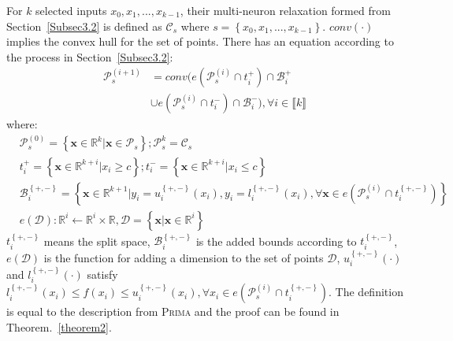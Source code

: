 \documentclass[runningheads]{llncs}
\newcommand{\prima}{\textsc{Prima}\xspace}
\newcommand{\myvec}[1]{\boldsymbol{#1}}
\begin{document}
\begin{definition}\label{Def3}
For $k$ selected inputs $x_{0},x_{1},...,x_{k-1}$, their multi-neuron relaxation formed from Section~\ref{Subsec3.2} is defined as
$\mathcal{C}_{s}$ where $s = \left \{x_{0},x_{1},...,x_{k-1}\right \}$. 
$conv(\cdot)$ implies the convex hull for the set of points. 
There has an equation according to the process in Section~\ref{Subsec3.2}:
\begin{equation}\label{C}
\begin{aligned}
\mathcal{P}_{s}^{(i+1)} &= conv( e(\mathcal{P}^{(i)}_{s} \cap t_{i}^{+} ) \cap \mathcal{B}_{i}^{+}\\ 
&\cup e(\mathcal{P}^{(i)}_{s} \cap t_{i}^{-} ) \cap \mathcal{B}_{i}^{-}), \forall i \in \llbracket  k \rrbracket
\end{aligned}
\end{equation}
where:
\begin{equation*}
\begin{aligned}
&\mathcal{P}_{s}^{(0)} = \left\{ \myvec{x} \in \mathbb{R}^{k}|\myvec{x} \in \mathcal{P}_{s} \right\};\mathcal{P}_{s}^{k}=\mathcal{C}_{s}\\
&t_{i}^{+} = \left\{ \myvec{x} \in \mathbb{R}^{k+i}|x_{i} \geq c \right\};t_{i}^{-} = \left\{ \myvec{x} \in \mathbb{R}^{k+i}|x_{i} \leq c \right\}\\
&\mathcal{B}_{i}^{\left\{+,-\right\}} = \left\{ \myvec{x} \in \mathbb{R}^{k+1} | y_{i}=u^{\left\{+,-\right\}}_{i}(x_{i}),y_{i}=l^{\left\{+,-\right\}}_{i}(x_{i}),\forall \myvec{x} \in e(\mathcal{P}^{(i)}_{s} \cap t_{i}^{\left\{+,-\right\}}) \right\} \\
&e(\mathcal{D}):\mathbb{R}^{i} \leftarrow \mathbb{R}^{i}\times \mathbb{R}, \mathcal{D} = \left\{ \myvec{x}|\myvec{x}\in \mathbb{R}^{i} \right\}
\end{aligned}
\end{equation*}
$t_{i}^{\left\{+,- \right\}}$ means the split space, $\mathcal{B}_{i}^{\left\{+,- \right\}}$ is the added bounds according to $t_{i}^{\left\{+,- \right\}}$, $e(\mathcal{D})$ is the function for adding a dimension to the  set of points $\mathcal{D}$, $u^{\left\{+,-\right\}}_{i}(\cdot)$ and $l^{\left\{+,-\right\}}_{i}(\cdot)$ satisfy $l^{\left\{+,- \right\}}_{i}(x_{i}) \leq f(x_{i}) \leq u^{\left\{+,- \right\}}_{i}(x_{i}), \forall x_{i} \in e(\mathcal{P}^{(i)}_{s} \cap t_{i}^{\left\{+,-\right\}})$. The definition is equal to the description from \prima and the proof can be found in Theorem.~\ref{theorem2}.
\end{definition}
\end{document}
